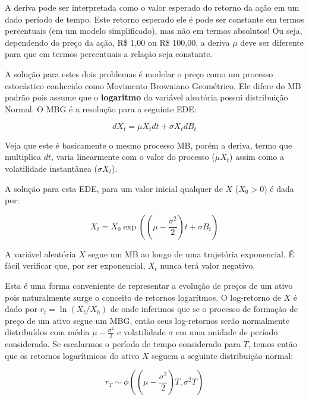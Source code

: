 \documentclass[]{book}
\begin{document}
A deriva pode ser interpretada como o valor esperado do retorno da ação
em um dado período de tempo. Este retorno esperado ele é pode ser
constante em termos percentuais (em um modelo simplificado), mas não em
termos absolutos! Ou seja, dependendo do preço da ação, R\$ 1,00 ou R\$
100,00, a deriva \(\mu\) deve ser diferente para que em termos
percentuais a relação seja constante.

A solução para estes dois problemas é modelar o preço como um processo
estocástico conhecido como Movimento Browniano Geométrico. Ele difere do
MB padrão pois assume que o \textbf{logaritmo} da variável aleatória
possui distribuição Normal. O MBG é a resolução para a seguinte EDE:

\begin{equation}
dX_t = \mu X_t dt + \sigma X_t dB_t
\label{eq:mbg}
\end{equation}

Veja que este é basicamente o mesmo processo MB, porém a deriva, termo
que multiplica \(dt\), varia linearmente com o valor do processo
(\(\mu X_t\)) assim como a volatilidade instantânea (\(\sigma X_t\)).

A solução para esta EDE, para um valor inicial qualquer de \(X\)
(\(X_0 > 0\)) é dada por:

\begin{equation}
X_t = X_0\exp\left(\left(\mu-\frac{\sigma^2}{2}\right)t+\sigma B_t\right)
\label{eq:mbgsol}
\end{equation}

A variável aleatória \(X\) segue um MB ao longo de uma trajetória
exponencial. É fácil verificar que, por ser exponencial, \(X_t\) nunca
terá valor negativo.

Esta é uma forma conveniente de representar a evolução de preços de um
ativo pois naturalmente surge o conceito de retornos logarítmos. O
log-retorno de \(X\) é dado por \(r_t=\ln(X_t/X_0)\) de onde inferimos
que se o processo de formação de preço de um ativo segue um MBG, então
seus log-retornos serão normalmente distribuídos com média
\(\mu-\frac{\sigma^2}{2}\) e volatilidade \(\sigma\) em uma unidade de
período considerado. Se escalarmos o período de tempo considerado para
\(T\), temos então que os retornos logarítmicos do ativo \(X\) seguem a
seguinte distribuição normal:

\begin{equation}
r_T \sim\phi\left(\left(\mu-\frac{\sigma^2}{2}\right)T, \sigma^2T\right)
\label{eq:rT}
\end{equation}
\end{document}
